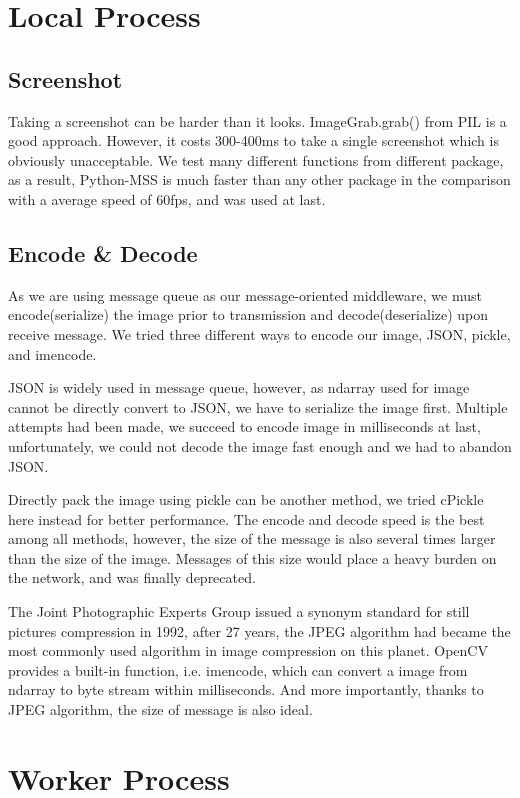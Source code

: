 \documentclass[runningheads]{llncs}
\begin{document}
\section{Local Process}
\subsection{Screenshot}
Taking a screenshot can be harder than it looks. 
ImageGrab.grab() from PIL is a good approach. However, 
it costs 300-400ms to take a single screenshot which is 
obviously unacceptable. We test many different functions 
from different package, as a result, Python-MSS is much 
faster than any other package in the comparison with a 
average speed of 60fps, and was used at last.

\subsection{Encode \& Decode}
As we are using message queue as our message-oriented 
middleware, we must encode(serialize) the image prior to 
transmission and decode(deserialize) upon receive message. 
We tried three different ways to encode our image, JSON, 
pickle, and imencode. 

JSON is widely used in message queue, however, as ndarray 
used for image cannot be directly convert to JSON, we have 
to serialize the image first. Multiple attempts had been 
made, we succeed to encode image in milliseconds at last, 
unfortunately, we could not decode the image fast enough 
and we had to abandon JSON. 

Directly pack the image using pickle can be another method, 
we tried cPickle here instead for better performance. The 
encode and decode speed is the best among all methods, 
however, the size of the message is also several times 
larger than the size of the image. Messages of this size 
would place a heavy burden on the network, and was finally 
deprecated. 

The Joint Photographic Experts Group issued a synonym 
standard for still pictures compression in 1992, after 
27 years, the JPEG algorithm had became the most commonly 
used algorithm in image compression on this planet. OpenCV 
provides a built-in function, i.e. imencode, which can 
convert a image from ndarray to byte stream within 
milliseconds. And more importantly, thanks to JPEG 
algorithm, the size of message is also ideal. 


\section{Worker Process}
\end{document}
